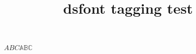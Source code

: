 \documentclass{article}
\title{dsfont tagging test}
\begin{document}
$ABC\mathds{ABC}$
\end{document}
